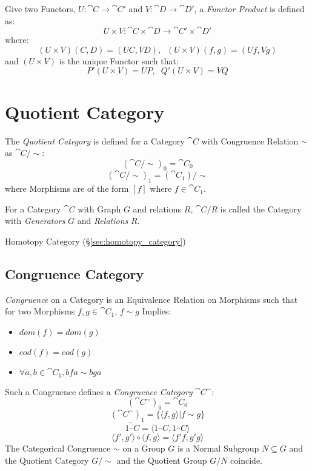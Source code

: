Give two Functors, $U : \cat{C} \rightarrow \cat{C'}$ and $V :
\cat{D} \rightarrow \cat{D'}$, a \emph{Functor Product} is
defined as:
\[
  U \times V : \cat{C} \times \cat{D}
  \rightarrow \cat{C'} \times \cat{D'}
\]
where:
\[
  (U \times V)(C,D) = (UC,VD), \;\; (U \times V)(f,g) = (Uf,Vg)
\]
and $(U \times V)$ is the unique Functor such that:
\[
  P'(U \times V) = UP, \;\; Q'(U \times V) = VQ
\]



\section{Quotient Category}\label{sec:quotient_category}


The \emph{Quotient Category} is defined for a Category $\cat{C}$
with Congruence Relation $\sim$ as $\cat{C}/\sim$:
\[
  (\cat{C}/\sim)_0 = \cat{C_0}
\]\[
  (\cat{C}/\sim)_1 = (\cat{C_1})/\sim
\]
where Morphisms are of the form $[f]$ where $f \in \cat{C_1}$.

For a Category $\cat{C}$ with Graph $G$ and relations $R$,
$\cat{C}/R$ is called the Category with \emph{Generators} $G$ and
\emph{Relations} $R$.

Homotopy Category (\S\ref{sec:homotopy_category})



\subsection{Congruence Category}\label{sec:congruence_category}

\emph{Congruence} on a Category is an Equivalence Relation on
Morphisms such that for two Morphisms $f,g \in \cat{C_1}$, $f \sim
g$ Implies:
\begin{itemize}
  \item $dom(f) = dom(g)$
  \item $cod(f) = cod(g)$
  \item $\forall a,b \in \cat{C_1}, bfa \sim bga$
\end{itemize}
Such a Congruence defines a \emph{Congruence Category}
$\cat{C^{\sim}}$:
\[
  (\cat{C^{\sim}})_0 = \cat{C}_0
\]\[
  (\cat{C^{\sim}})_1 = \{\langle f,g \rangle | f \sim g\}
\]\[
  \tilde{1_\cat{C}} = \langle 1_\cat{C}, 1_\cat{C} \rangle
\]\[
  \langle f',g' \rangle \circ \langle f,g \rangle = \langle f'f,g'g \rangle
\]
The Categorical Congruence $\sim$ on a Group $G$ is a Normal Subgroup
$N \subseteq G$ and the Quotient Category $G/\sim$ and the Quotient
Group $G/N$ coincide. \cite{awodey06}



